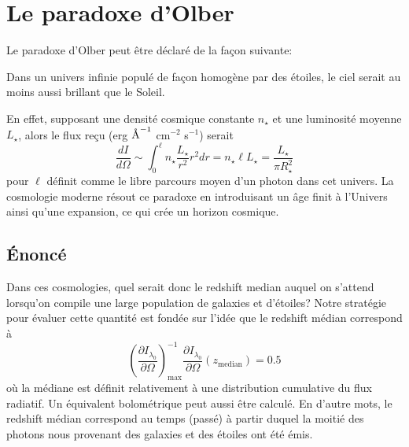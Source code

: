 \documentclass{article}
\newcommand{\angstrom}{\textup{\AA}}
\numberwithin{equation}{section}
\begin{document}
\section{Le paradoxe d'Olber}
Le paradoxe d'Olber peut être déclaré de la façon suivante: 
\begin{quoting}
        Dans un univers infinie populé de façon homogène par des étoiles, le ciel serait 
        au moins aussi brillant que le Soleil.
\end{quoting}
En effet, supposant une densité cosmique constante $n_\star$ et une luminosité moyenne $L_\star$, 
alors le flux reçu (erg $\angstrom^{-1}$ cm$^{-2}$ s$^{-1}$) serait 
\[
        \frac{d I}{d \Omega} \sim \int_0^\ell n_\star \frac{L_\star}{r^2} r^2 dr 
        = n_\star \ell L_\star  = \frac{L_\star}{\pi R_\star^2}
\]
pour $\ell$ définit comme le libre parcours moyen d'un photon dans cet univers.
La cosmologie moderne résout ce paradoxe en introduisant un âge finit à l'Univers ainsi 
qu'une expansion, ce qui crée un horizon cosmique.
\subsection{Énoncé}

Dans ces cosmologies, quel serait donc le redshift median auquel on s'attend lorsqu'on 
compile une large population de galaxies et d'étoiles? Notre stratégie pour évaluer cette 
quantité est fondée sur l'idée que le redshift médian correspond à 
\[
        \left( \frac{\partial I_{\lambda_0}}{\partial \Omega} \right)_{\max}^{-1} 
        \frac{\partial I_{\lambda_0}}{\partial \Omega}(z_{\text{median}}) = 0.5
\]
où la médiane est définit relativement à une distribution cumulative du flux radiatif.
Un équivalent bolométrique peut aussi être 
calculé. En d'autre mots, le redshift médian correspond au temps (passé)
à partir duquel la moitié des photons 
nous provenant des galaxies et des étoiles ont été émis.
\end{document}
